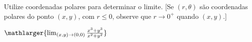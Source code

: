 Utilize coordenadas polares para determinar o limite. [Se $(r,\theta)$ são coordenadas polares do ponto $(x,y)$, com $r\leq 0$, observe que $r \rightarrow 0^+$ quando $(x,y)
$.]


\item $\mathlarger{\lim_{(x,y)\rightarrow(0,0)} \frac{x^3+y^3}{x^2+y^2}}$